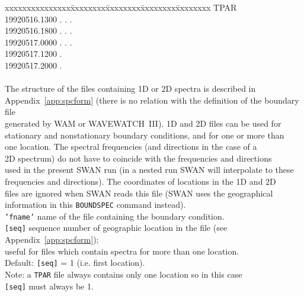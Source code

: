\documentclass[12pt]{book}
\begin{document}
\begin{tabbing}
                           xxxxxxxxxxxxxxx\=xxxxxxxx\=xxxxxxxx\=xxxxxxxx\=xxxxxxxx \kill
                           TPAR\\
                           19920516.1300     .  .  .\\
                           19920516.1800     .  .  .\\
                           19920517.0000     .   .  .\\
                           19920517.1200       .   \\
                           19920517.2000       .   \\
                                           \>          \>          \>           \>       \\
                        \poptabs
                        The structure of the files containing 1D or 2D spectra is described in\\
                        Appendix~\ref{app:spcform} (there is no relation with the definition of the boundary file\\
                        generated by WAM or WAVEWATCH~III). 1D and 2D files can be used for\\
                        stationary and nonstationary boundary conditions, and for one or more than\\
                        one location. The spectral frequencies (and directions in the case of a\\
                        2D spectrum) do not have to coincide with the frequencies and directions\\
                        used in the present SWAN run (in a nested run SWAN will interpolate to these\\
                        frequencies and directions). The coordinates of locations in the 1D and 2D\\
                        files are ignored when SWAN reads this file (SWAN uses the geographical\\
                        information in this {\tt BOUNDSPEC} command instead).\-\\
{\tt {'fname'}}      \> name of the file containing the boundary condition.\\
{\tt [seq]}          \> sequence number of geographic location in the file (see Appendix~\ref{app:spcform});\+\\
                        useful for files which contain spectra for more than one location.\\
                        Default: {\tt [seq]} = 1 (i.e. first location).\\
                        Note: a {\tt TPAR} file always contains only one location so in this case\\
                        {\tt [seq]} must always be 1.\-\\
\end{tabbing}
\end{document}
